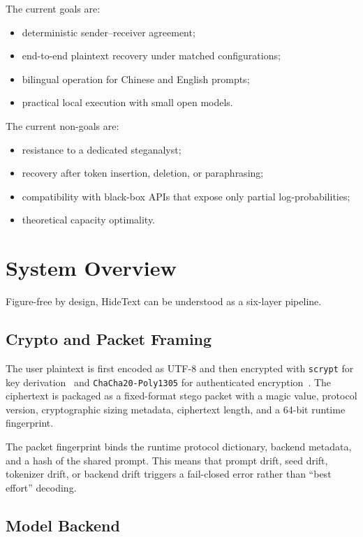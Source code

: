 \documentclass[sigconf,review,anonymous]{acmart}
\begin{document}
The current goals are:

\begin{itemize}
    \item deterministic sender--receiver agreement;
    \item end-to-end plaintext recovery under matched configurations;
    \item bilingual operation for Chinese and English prompts;
    \item practical local execution with small open models.
\end{itemize}

The current non-goals are:

\begin{itemize}
    \item resistance to a dedicated steganalyst;
    \item recovery after token insertion, deletion, or paraphrasing;
    \item compatibility with black-box APIs that expose only partial log-probabilities;
    \item theoretical capacity optimality.
\end{itemize}

\section{System Overview}

Figure-free by design, HideText can be understood as a six-layer pipeline.

\subsection{Crypto and Packet Framing}

The user plaintext is first encoded as UTF-8 and then encrypted with \texttt{scrypt} for key derivation~\cite{rfc7914} and \texttt{ChaCha20-Poly1305} for authenticated encryption~\cite{rfc8439}. The ciphertext is packaged as a fixed-format stego packet with a magic value, protocol version, cryptographic sizing metadata, ciphertext length, and a 64-bit runtime fingerprint.

The packet fingerprint binds the runtime protocol dictionary, backend metadata, and a hash of the shared prompt. This means that prompt drift, seed drift, tokenizer drift, or backend drift triggers a fail-closed error rather than ``best effort'' decoding.

\subsection{Model Backend}
\end{document}
